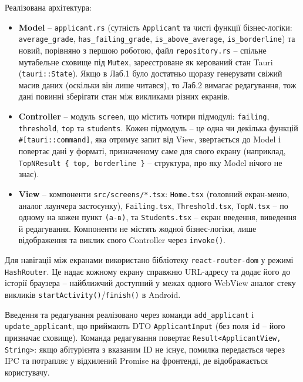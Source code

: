 \documentclass[14pt, a4paper]{extreport}
\begin{document}
	Реалізована архітектура:

	\begin{itemize}
		\item \textbf{Model} -- \texttt{applicant.rs} (сутність \texttt{Applicant} та чисті функції бізнес-логіки: \texttt{average\_grade}, \texttt{has\_failing\_grade}, \texttt{is\_above\_average}, \texttt{is\_borderline}) та новий, порівняно з першою роботою, файл \texttt{repository.rs} -- спільне мутабельне сховище під \texttt{Mutex}, зареєстроване як керований стан Tauri (\texttt{tauri::State}). Якщо в Лаб.1 було достатньо щоразу генерувати свіжий масив даних (оскільки він лише читався), то Лаб.2 вимагає редагування, тож дані повинні зберігати стан між викликами різних екранів.

		\item \textbf{Controller} -- модуль \texttt{screen}, що містить чотири підмодулі: \texttt{failing}, \texttt{threshold}, \texttt{top} та \texttt{students}. Кожен підмодуль -- це одна чи декілька функцій \texttt{\#[tauri::command]}, яка отримує запит від View, звертається до Model і повертає дані у форматі, призначеному саме для свого екрану (наприклад, \texttt{TopNResult \{ top, borderline \}} -- структура, про яку Model нічого не знає).

		\item \textbf{View} -- компоненти \texttt{src/screens/*.tsx}: \texttt{Home.tsx} (головний екран-меню, аналог лаунчера застосунку), \texttt{Failing.tsx}, \texttt{Threshold.tsx}, \texttt{TopN.tsx} -- по одному на кожен пункт \texttt{(a-в)}, та \texttt{Students.tsx} -- екран введення, виведення й редагування. Компоненти не містять жодної бізнес-логіки, лише відображення та виклик свого Controller через \texttt{invoke()}.
	\end{itemize}

	Для навігації між екранами використано бібліотеку \texttt{react-router-dom} у режимі \texttt{HashRouter}. Це надає кожному екрану справжню URL-адресу та додає його до історії браузера -- найближчий доступний у межах одного WebView аналог стеку викликів \texttt{startActivity()}/\texttt{finish()} в Android.

	Введення та редагування реалізовано через команди \texttt{add\_applicant} і \texttt{update\_applicant}, що приймають DTO \texttt{ApplicantInput} (без поля \texttt{id} -- його призначає сховище). Команда редагування повертає \texttt{Result<ApplicantView, String>}: якщо абітурієнта з вказаним ID не існує, помилка передається через IPC та потрапляє у відхилений Promise на фронтенді, де відображається користувачу.
	
\end{document}
